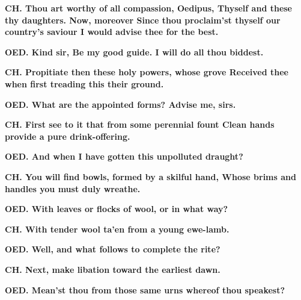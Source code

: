 \documentclass[11pt,letter]{book}
\begin{document}
\par \textbf{CH. Thou art worthy of all compassion, Oedipus, Thyself and these thy daughters. Now, moreover Since thou proclaim’st thyself our country’s saviour I would advise thee for the best.}
\par 

\par \textbf{OED. Kind sir, Be my good guide. I will do all thou biddest.}
\par 

\par \textbf{CH. Propitiate then these holy powers, whose grove Received thee when first treading this their ground.}
\par 

\par \textbf{OED. What are the appointed forms? Advise me, sirs.}
\par 

\par \textbf{CH. First see to it that from some perennial fount Clean hands provide a pure drink-offering.}
\par 

\par \textbf{OED. And when I have gotten this unpolluted draught?}
\par 

\par \textbf{CH. You will find bowls, formed by a skilful hand, Whose brims and handles you must duly wreathe.}
\par 

\par \textbf{OED. With leaves or flocks of wool, or in what way?}
\par 

\par \textbf{CH. With tender wool ta’en from a young ewe-lamb.}
\par 

\par \textbf{OED. Well, and what follows to complete the rite?}
\par 

\par \textbf{CH. Next, make libation toward the earliest dawn.}
\par 

\par \textbf{OED. Mean’st thou from those same urns whereof thou speakest?}
\par 
\end{document}
